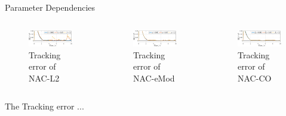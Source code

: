 \documentclass[8pt, aspectratio=169]{beamer}
\begin{document}
\begin{frame}{Parameter Dependencies}

  \begin{columns}

      \begin{figure}      
        \includegraphics[width=0.99\textwidth]{figures/ECC/fig6.eps}
        \caption{Tracking error of NAC-L2}
      \end{figure}
      

      \begin{figure}
        \includegraphics[width=0.99\textwidth]{figures/ECC/fig7.eps}
        \caption{Tracking error of NAC-eMod}
      \end{figure}


      \begin{figure}
        \includegraphics[width=0.99\textwidth]{figures/ECC/fig5.eps}
        \caption{Tracking error of NAC-CO}
      \end{figure}
    
  \end{columns}

  The Tracking error ...

\end{frame}
\end{document}
